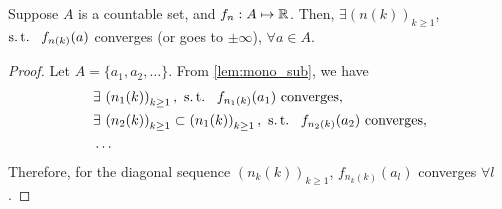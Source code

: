 \documentclass[12pt]{article}
\begin{document}
\begin{Lemma} \label{wk9:lemma:Cantor_diag}
Suppose $A$ is a countable set, and $f_n:A \mapsto \mathbb{R}$. Then, $\exists \left(n(k)\right)_{k \geq 1}$, $\st\ f_{n(k)}(a)$ converges (or goes to $\pm \infty$), $\forall a \in A$.
\end{Lemma}
\begin{proof}
Let $A = \{a_1, a_2, \ldots\}$. From \cref{lem:mono_sub}, we have
\begin{align*}
& \exists \left(n_1(k)\right)_{k \geq 1}, \ \st\ f_{n_1(k)}(a_1)\ \text{converges}, \\
& \exists \left(n_2(k)\right)_{k \geq 1} \subset \left(n_1(k)\right)_{k \geq 1}, \ \st\ f_{n_2(k)}(a_2)\ \text{converges}, \\
& \ldots
\end{align*}
Therefore, for the diagonal sequence $\left(n_k(k)\right)_{k \geq 1}$, $f_{n_{k}(k)}(a_{l})$ converges $\forall l$.
\end{proof}
\end{document}
